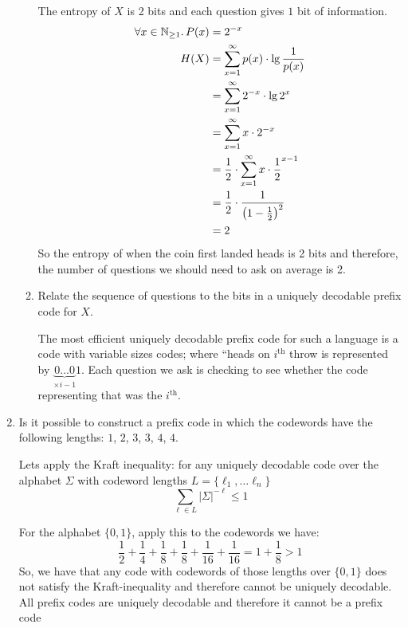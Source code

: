 \documentclass[10pt,\jkfside,a4paper]{article}
\begin{document}
\begin{enumerate}
\begin{enumerate}
        The entropy of $X$ is 2 bits and each question gives $1$ bit of information.
        \begin{align}
            \forall x \in \mathbb{N}_{\ge 1}\ldotp P(x) &= 2^{-x} \\
            H(X)
            &= \sum^{\infty}_{x = 1} p(x) \cdot \lg \frac{1}{p(x)} \\
            &= \sum^{\infty}_{x = 1} 2^{-x} \cdot \lg 2^{x} \\
            &= \sum^{\infty}_{x = 1} x \cdot 2^{-x} \\
            &= \frac12 \cdot \sum^{\infty}_{x = 1} x \cdot \frac12^{x - 1} \\
            &= \frac12 \cdot \frac{1}{\left(1 - \frac12\right)^2} \\
            &= 2
        \end{align}
        So the entropy of when the coin first landed heads is 2 bits and therefore, the number of questions we should need to ask on average is 2.

        \item Relate the sequence of questions to the bits in a uniquely decodable prefix code for $X$.

        The most efficient uniquely decodable prefix code for such a language is a code with variable sizes codes; where ``heads on $i^{\text{th}}$ throw is represented by
        $\underbrace{0\ldots0}_{\times {i - 1}}1$. Each question we ask is checking to see whether the code representing that was the $i^{\text{th}}$.

    \end{enumerate}

    \item Is it possible to construct a prefix code in which the codewords have the following lengths: $1$, $2$, $3$, $3$, $4$, $4$.

    Lets apply the Kraft inequality: for any uniquely decodable code over the alphabet $\Sigma$ with codeword lengths $L = \{\ell_1, \ldots \ell_n\}$
    \[
        \sum_{\ell \in L} |\Sigma|^{-\ell} \le 1
    \]

    For the alphabet $\{0, 1\}$, apply this to the codewords we have:
    \[
        \frac12 + \frac14 + \frac18 + \frac18 + \frac1{16} + \frac1{16} = 1 + \frac18 > 1
    \]
    So, we have that any code with codewords of those lengths over $\{0, 1\}$ does not satisfy the Kraft-inequality and therefore cannot be uniquely decodable. All prefix codes are uniquely decodable and
    therefore it cannot be a prefix code


\end{enumerate}
\end{document}
